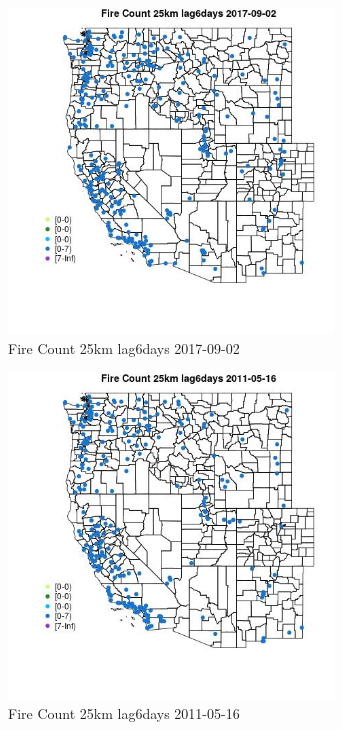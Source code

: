 \begin{figure} 
\centering  
\includegraphics[width=0.77\textwidth]{Code_Outputs/Report_ML_input_PM25_Step4_part_e_de_duplicated_aves_compiled_2019-05-20wNAs_MapObsFire_Count_25km_lag6days2017-09-02.jpg} 
\caption{\label{fig:Report_ML_input_PM25_Step4_part_e_de_duplicated_aves_compiled_2019-05-20wNAsMapObsFire_Count_25km_lag6days2017-09-02}Fire Count 25km lag6days 2017-09-02} 
\end{figure} 
 

\begin{figure} 
\centering  
\includegraphics[width=0.77\textwidth]{Code_Outputs/Report_ML_input_PM25_Step4_part_e_de_duplicated_aves_compiled_2019-05-20wNAs_MapObsFire_Count_25km_lag6days2011-05-16.jpg} 
\caption{\label{fig:Report_ML_input_PM25_Step4_part_e_de_duplicated_aves_compiled_2019-05-20wNAsMapObsFire_Count_25km_lag6days2011-05-16}Fire Count 25km lag6days 2011-05-16} 
\end{figure} 
 

